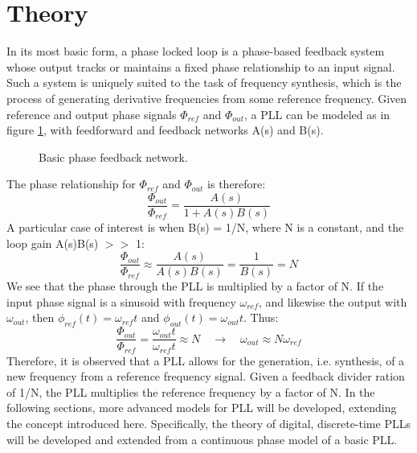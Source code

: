 \section{Theory}\label{theory}
	In its most basic form, a phase locked loop is a phase-based feedback system whose output tracks or maintains a fixed phase relationship to an input signal. Such a system is uniquely suited to the task of frequency synthesis, which is the process of generating derivative frequencies from some reference frequency. Given reference and output phase signals $\Phi_{ref}$ and $\Phi_{out}$, a PLL can be modeled as in figure \ref{fig:basic_fb}, with feedforward and feedback networks A(s) and B(s). 
	\begin{figure}[htb!]
		\center
		\caption{Basic phase feedback network.}
		\label{fig:basic_fb}
	\end{figure}
	\FloatBarrier
	The phase relationship for $\Phi_{ref}$ and $\Phi_{out}$ is therefore:
	\begin{equation}
		\frac{\Phi_{out}}{\Phi_{ref}} = \frac{A(s)}{1+A(s)B(s)}
	\end{equation}
	A particular case of interest is when B(s) = 1/N, where N is a constant, and the loop gain A(s)B(s) $>>$ 1:
	\begin{equation}\label{mult_by_n}
		\frac{\Phi_{out}}{\Phi_{ref}} \approx \frac{A(s)}{A(s)B(s)} = \frac{1}{B(s)} = N
	\end{equation}
	We see that the phase through the PLL is multiplied by a factor of N. If the input phase signal is a sinusoid with frequency $\omega_{ref}$, and likewise the output with $\omega_{out}$, then $\phi_{ref}(t)=\omega_{ref}t$ and $\phi_{out}(t)=\omega_{out}t$. Thus:
	\begin{equation}\label{mult_by_n}
		\frac{\Phi_{out}}{\Phi_{ref}} = \frac{\omega_{out}t}{\omega_{ref}t} \approx N \hspace{1em} \rightarrow \hspace{1em} \omega_{out} \approx N\omega_{ref}
	\end{equation}
	Therefore, it is observed that a PLL allows for the generation, i.e. synthesis, of a new frequency from a reference frequency signal. Given a feedback divider ration of 1/N, the PLL multiplies the reference frequency by a factor of N. In the following sections, more advanced models for PLL will be developed, extending the concept introduced here. Specifically, the theory of digital, discrete-time PLLs will be developed and extended from a continuous phase model of a basic PLL.

